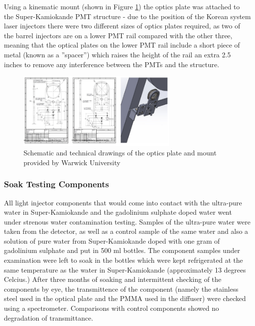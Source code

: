 Using a kinematic mount (shown in Figure \ref{fig:mount}) the optics plate was attached to the Super-Kamiokande PMT structure - due to the position of the Korean system laser injectors there were two different sizes of optics plates required, as two of the barrel injectors are on a lower PMT rail compared with the other three, meaning that the optical plates on the lower PMT rail include a short piece of metal (known as a ''spacer'') which raises the height of the rail an extra 2.5 inches to remove any interference between the PMTs and the structure.

\begin{figure}
    \centering
    \includegraphics[width=0.7\textwidth]{Figures/mount.png}
    \caption{Schematic and technical drawings of the optics plate and mount provided by Warwick University}
    \label{fig:mount}
\end{figure}


\subsubsection{Soak Testing Components}

All light injector components that would come into contact with the ultra-pure water in Super-Kamiokande and the gadolinium sulphate doped water went under strenous water contamination testing. Samples of the ultra-pure water were taken from the detector, as well as a control sample of the same water and also a solution of pure water from Super-Kamiokande doped with one gram of gadolinium sulphate and put in 500 ml bottles. The component samples under examination were left to soak in the bottles which were kept refrigerated at the same temperature as the water in Super-Kamiokande (approximately 13 degrees Celcius.) After three months of soaking and intermittent checking of the components by eye, the transmittence of the component (namely the stainless steel used in the optical plate and the PMMA used in the diffuser) were checked using a spectrometer. Comparisons with control components showed no degradation of transmittance. 

